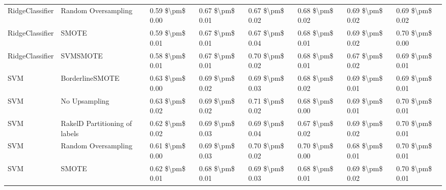 \begin{tabular}{llllllll}
                RidgeClassifier &           Random Oversampling & 0.59 \$\textbackslash pm\$ 0.00 &           0.67 \$\textbackslash pm\$ 0.01 &       0.67 \$\textbackslash pm\$ 0.02 &        0.68 \$\textbackslash pm\$ 0.02 &                         0.69 \$\textbackslash pm\$ 0.02 &     0.69 \$\textbackslash pm\$ 0.02 \\
                RidgeClassifier &                         SMOTE & 0.59 \$\textbackslash pm\$ 0.01 &           0.67 \$\textbackslash pm\$ 0.01 &       0.67 \$\textbackslash pm\$ 0.04 &        0.68 \$\textbackslash pm\$ 0.01 &                         0.69 \$\textbackslash pm\$ 0.02 &     0.70 \$\textbackslash pm\$ 0.00 \\
                RidgeClassifier &                      SVMSMOTE & 0.58 \$\textbackslash pm\$ 0.01 &           0.67 \$\textbackslash pm\$ 0.01 &       0.70 \$\textbackslash pm\$ 0.02 &        0.68 \$\textbackslash pm\$ 0.01 &                         0.67 \$\textbackslash pm\$ 0.02 &     0.69 \$\textbackslash pm\$ 0.01 \\
                            SVM &               BorderlineSMOTE & 0.63 \$\textbackslash pm\$ 0.00 &           0.69 \$\textbackslash pm\$ 0.02 &       0.69 \$\textbackslash pm\$ 0.03 &        0.68 \$\textbackslash pm\$ 0.02 &                         0.69 \$\textbackslash pm\$ 0.01 &     0.69 \$\textbackslash pm\$ 0.01 \\
                            SVM &                 No Upsampling & 0.63 \$\textbackslash pm\$ 0.02 &           0.69 \$\textbackslash pm\$ 0.02 &       0.71 \$\textbackslash pm\$ 0.02 &        0.68 \$\textbackslash pm\$ 0.00 &                         0.69 \$\textbackslash pm\$ 0.01 &     0.70 \$\textbackslash pm\$ 0.01 \\
                            SVM & RakelD Partitioning of labels & 0.62 \$\textbackslash pm\$ 0.02 &           0.69 \$\textbackslash pm\$ 0.03 &       0.69 \$\textbackslash pm\$ 0.04 &        0.67 \$\textbackslash pm\$ 0.02 &                         0.69 \$\textbackslash pm\$ 0.02 &     0.70 \$\textbackslash pm\$ 0.01 \\
                            SVM &           Random Oversampling & 0.61 \$\textbackslash pm\$ 0.00 &           0.69 \$\textbackslash pm\$ 0.03 &       0.70 \$\textbackslash pm\$ 0.02 &        0.70 \$\textbackslash pm\$ 0.00 &                         0.68 \$\textbackslash pm\$ 0.01 &     0.70 \$\textbackslash pm\$ 0.01 \\
                            SVM &                         SMOTE & 0.62 \$\textbackslash pm\$ 0.01 &           0.68 \$\textbackslash pm\$ 0.01 &       0.69 \$\textbackslash pm\$ 0.03 &        0.68 \$\textbackslash pm\$ 0.01 &                         0.69 \$\textbackslash pm\$ 0.02 &     0.70 \$\textbackslash pm\$ 0.01 \\

\end{tabular}
